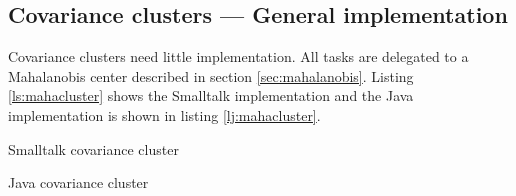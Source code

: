 \documentclass[twoside]{book}
\begin{document}
\subsection{Covariance clusters --- General implementation}
 Covariance clusters need little
implementation. All tasks are delegated to a Mahalanobis center
described in section \ref{sec:mahalanobis}. Listing
\ref{ls:mahacluster} shows the Smalltalk implementation and the
Java implementation is shown in listing \ref{lj:mahacluster}.

\begin{listing} Smalltalk covariance cluster \label{ls:mahacluster}

\end{listing}

\begin{listing} Java covariance cluster \label{lj:mahacluster}

\end{listing}

\ifx\wholebook\relax\else
\end{document}
